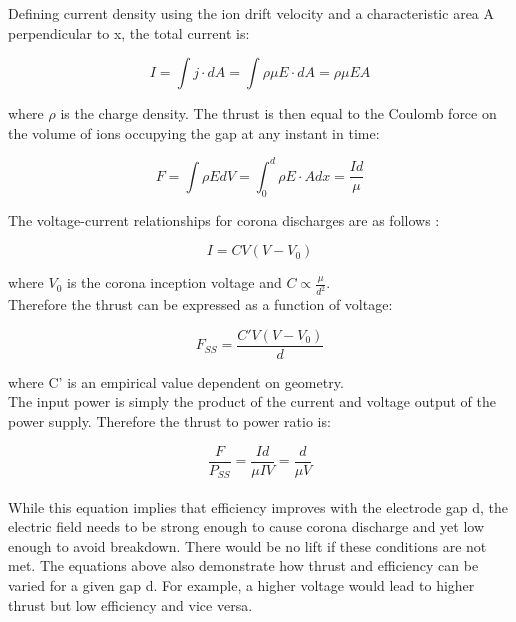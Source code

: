 \documentclass[11pt]{article}
\begin{document}
Defining current density using the ion drift velocity and a characteristic area A perpendicular to x, the total current is:

\begin{equation}
I = \int j \cdot dA = \int \rho \mu E \cdot dA = \rho \mu EA
\end{equation}

where $\rho$ is the charge density. The thrust is then equal to the Coulomb force on the volume of ions occupying the gap at any instant in time:

\begin{equation}
F = \int \rho E dV = \int_0^d \rho E \cdot A dx = \frac{Id}{\mu}
\end{equation}

The voltage-current relationships for corona discharges are as follows \cite{ehdperform}:

\begin{equation}
I = CV(V-V_0)
\end{equation}

where $V_0$ is the corona inception voltage and $C \propto \frac{\mu}{d^2}$.\\

Therefore the thrust can be expressed as a function of voltage:

\begin{equation}
F_{SS} = \frac{C'V(V-V_0)}{d}
\end{equation}

where C' is an empirical value dependent on geometry.\\

The input power is simply the product of the current and voltage output of the power supply. Therefore the thrust to power ratio is:

\begin{equation}
\frac{F}{P_{SS}} = \frac{Id}{\mu IV} = \frac{d}{\mu V}
\end{equation}
\\

While this equation implies that efficiency improves with the electrode gap d, the electric field needs to be strong enough to cause corona discharge and yet low enough to avoid breakdown. There would be no lift if these conditions are not met. The equations above also demonstrate how thrust and efficiency can be varied for a given gap d. For example, a higher voltage would lead to higher thrust but low efficiency and vice versa.\\
\end{document}

